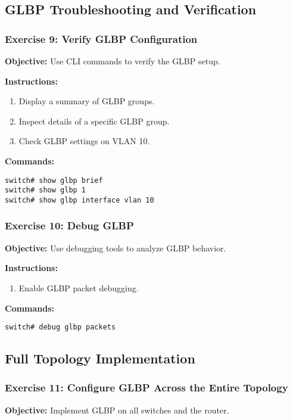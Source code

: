 \documentclass[12pt]{article}
\begin{document}
\bigskip

\subsection{GLBP Troubleshooting and Verification}

\subsubsection*{Exercise 9: Verify GLBP Configuration}
\textbf{Objective:} Use CLI commands to verify the GLBP setup.

\textbf{Instructions:}
\begin{enumerate}
\item Display a summary of GLBP groups.
\item Inspect details of a specific GLBP group.
\item Check GLBP settings on VLAN 10.
\end{enumerate}

\textbf{Commands:}
\begin{lstlisting}[style=CiscoCLI]
switch# show glbp brief
switch# show glbp 1
switch# show glbp interface vlan 10
\end{lstlisting}

\bigskip

\subsubsection*{Exercise 10: Debug GLBP}
\textbf{Objective:} Use debugging tools to analyze GLBP behavior.

\textbf{Instructions:}
\begin{enumerate}
\item Enable GLBP packet debugging.
\end{enumerate}

\textbf{Commands:}
\begin{lstlisting}[style=CiscoCLI]
switch# debug glbp packets
\end{lstlisting}

\bigskip

\subsection{Full Topology Implementation}

\subsubsection*{Exercise 11: Configure GLBP Across the Entire Topology}
\textbf{Objective:} Implement GLBP on all switches and the router.
\end{document}
